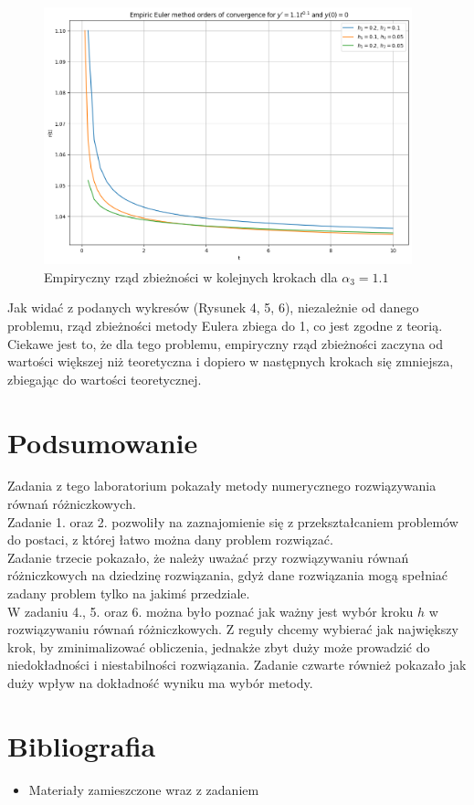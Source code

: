 \documentclass{article}
\begin{document}
\begin{figure}[H]
    \centering
    \includegraphics[width=0.95\textwidth]{6}
    \caption{Empiryczny rząd zbieżności w kolejnych krokach dla $\alpha_3 = 1.1$}
    \label{fig:mesh}
\end{figure}
Jak widać z podanych wykresów (Rysunek 4, 5, 6), niezależnie od danego problemu, rząd zbieżności metody Eulera zbiega do 1, co jest zgodne z teorią. Ciekawe jest to, że dla tego problemu, empiryczny rząd zbieżności zaczyna od wartości większej niż teoretyczna i dopiero w następnych krokach się zmniejsza, zbiegając do wartości teoretycznej.

\section{Podsumowanie}
Zadania z tego laboratorium pokazały metody numerycznego rozwiązywania równań różniczkowych.
\\
Zadanie 1. oraz 2. pozwoliły na zaznajomienie się z przekształcaniem problemów do postaci, z której łatwo można dany problem rozwiązać.
\\
Zadanie trzecie pokazało, że należy uważać przy rozwiązywaniu równań różniczkowych na dziedzinę rozwiązania, gdyż dane rozwiązania mogą spełniać zadany problem tylko na jakimś przedziale.
\\
W zadaniu 4., 5. oraz 6. można było poznać jak ważny jest wybór kroku $h$ w rozwiązywaniu równań różniczkowych. Z reguły chcemy wybierać jak największy krok, by zminimalizować obliczenia, jednakże zbyt duży może prowadzić do niedokładności i niestabilności rozwiązania. Zadanie czwarte również pokazało jak duży wpływ na dokładność wyniku ma wybór metody.

\section{Bibliografia}
\begin{itemize}
\item Materiały zamieszczone wraz z zadaniem
\end{itemize}
\end{document}
